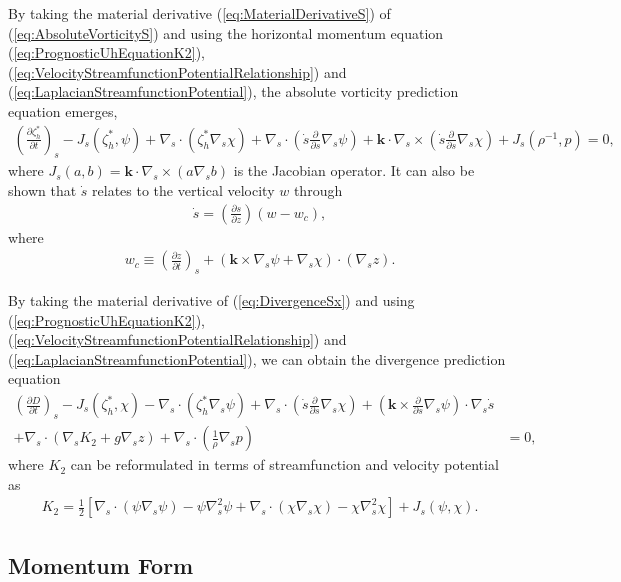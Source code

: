 \documentclass[gmd, manuscript]{copernicus}
\newcommand{\vb}{\mathbf}
\newcommand{\pdiff}[2]{\frac{\partial #1}{\partial #2}}
\providecommand{\DIFaddbegin}{} %
\providecommand{\DIFaddend}{} %
\begin{document}
By taking the material derivative (\ref{eq:MaterialDerivativeS}) of (\ref{eq:AbsoluteVorticityS}) and using the horizontal momentum equation (\ref{eq:PrognosticUhEquationK2}), (\ref{eq:VelocityStreamfunctionPotentialRelationship}) and (\ref{eq:LaplacianStreamfunctionPotential}), the absolute vorticity prediction equation emerges,
\begin{align}
\left( \pdiff{\zeta_h^\ast}{t} \right)_s - J_s(\zeta_h^\ast, \psi) + \nabla_s \cdot (\zeta_h^\ast \nabla_s \chi) + \nabla_s \cdot \left( \dot{s} \pdiff{}{s} \nabla_s \psi \right) + \vb{k} \cdot \nabla_s \times \left( \dot{s} \pdiff{}{s} \nabla_s \chi \right) + J_s(\rho^{-1}, p) = 0,
\end{align} where $J_s(a,b) = \vb{k} \cdot \nabla_s \times (a \nabla_s b)$ is the Jacobian operator.  It can also be shown that $\dot{s}$ relates to the vertical velocity $w$ through
\begin{align}
\dot{s} = \left( \pdiff{s}{z} \right) (w - w_c),
\end{align} where
\begin{align}
w_c \equiv \left( \pdiff{z}{t} \right)_s + \left( \vb{k} \times \nabla_s \psi + \nabla_s \chi \right) \cdot (\nabla_s z).
\end{align}

By taking the material derivative of (\ref{eq:DivergenceSx}) and using (\ref{eq:PrognosticUhEquationK2}), (\ref{eq:VelocityStreamfunctionPotentialRelationship}) and (\ref{eq:LaplacianStreamfunctionPotential}), we can obtain the divergence prediction equation
\begin{align}
\left( \pdiff{D}{t} \right)_s - J_s(\zeta_h^\ast, \chi) - \nabla_s \cdot (\zeta_h^\ast \nabla_s \psi) + \nabla_s \cdot \left( \dot{s} \pdiff{}{s} \nabla_s \chi \right) + \left( \vb{k} \times \pdiff{}{s} \nabla_s \psi \right) \cdot \nabla_s \dot{s} & \\
+ \nabla_s \cdot (\nabla_s K_2 + g \nabla_s z) + \nabla_s \cdot \left( \frac{1}{\rho} \nabla_s p \right) &= 0,
\end{align}  where $K_2$ can be reformulated in terms of streamfunction and velocity potential as
\begin{align}
K_2 = \frac{1}{2} \left[ \nabla_s \cdot (\psi \nabla_s \psi) - \psi \nabla_s^2 \psi + \nabla_s \cdot (\chi \nabla_s \chi) - \chi \nabla_s^2 \chi \right] + J_s(\psi, \chi).
\end{align}

\subsection{Momentum Form} \DIFaddbegin \label{sec:MomentumForm}
\DIFaddend 
\end{document}
